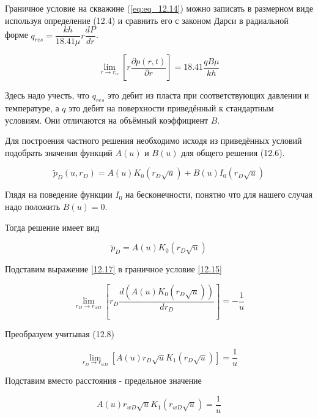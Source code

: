 Граничное условие на скважине (\ref{eq:eq_12.14}) можно записать в размерном виде используя определение (12.4) и сравнить его с законом Дарси в радиальной форме $q_{res} = \dfrac{kh}{18.41 \mu} r \dfrac{dP}{dr}$.

\begin{equation}  \label{eq:eq_12.16}
	\lim_{r \to r_{w}} \left[ r \dfrac{ \partial p(r, t)}{\partial r} \right] = 18.41 \dfrac{qB\mu}{kh} 
\end{equation}

Здесь надо учесть, что $q_{res}$ это дебит из пласта при соответствующих давлении и температуре, а $q$ это дебит на поверхности приведённый к стандартным условиям. Они отличаются на объёмный коэффициент $B$.


Для построения частного решения необходимо исходя из приведённых условий подобрать значения функций $A(u)$ и $B(u)$ для общего решения (12.6). 

\begin{equation}  \label{eq:eq_12.6}
	 \tilde{p}_D(u, r_D) = A(u) K_0(r_D \sqrt u) + B(u) I_0(r_D \sqrt u) 
\end{equation}


Глядя на поведение функции $I_0$ на бесконечности, понятно что для нашего случая надо положить $B(u) = 0 $. 

Тогда решение имеет вид

\begin{equation}  \label{eq:eq_12.17}
	 \tilde{p}_D = A(u) K_0(r_D \sqrt u) 
\end{equation}

Подставим выражение \eqref{12.17} в граничное условие \eqref{12.15}


\begin{equation}  \label{eq:eq_12.18}
	 \lim_{r_D \to r_{wD}} \left[ r_D \dfrac{ d \left( A(u) K_0(r_D \sqrt u)\right)}{d r_D} \right] = -\dfrac{1}{u} 
\end{equation} 

Преобразуем учитывая (12.8)

\begin{equation}  \label{eq:eq_12.19} 
	\lim_{r_D \to r_{wD}} \left[A(u) r_D\sqrt u  K_1(r_D \sqrt u) \right] = \dfrac{1}{u} 
\end{equation}

Подставим вместо расстояния - предельное значение

\begin{equation}  \label{eq:eq_12.20} 
	A(u) r_{wD} \sqrt u  K_1(r_{wD} \sqrt u)  = \dfrac{1}{u}
	\end{equation}

